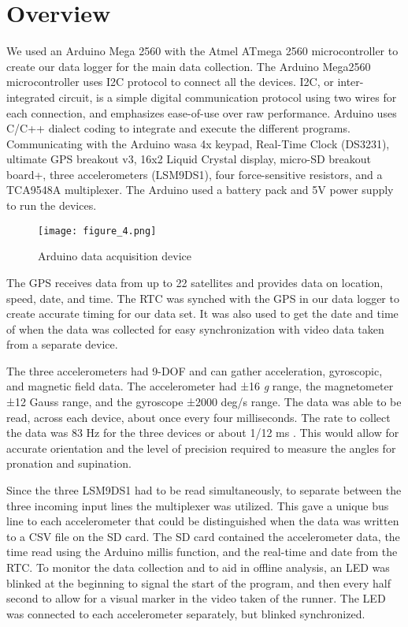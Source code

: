 \section{Overview}
We used an Arduino Mega 2560 with the Atmel ATmega 2560 microcontroller to create our data logger for the main data collection.
The Arduino Mega2560 microcontroller uses I2C protocol to connect all the devices.
I2C, or inter-integrated circuit, is a simple digital communication protocol using two wires for each connection, and emphasizes ease-of-use over raw performance.
Arduino uses C/C++ dialect coding to integrate and execute the different programs.
Communicating with the Arduino wasa  4x keypad, Real-Time Clock (DS3231), ultimate GPS breakout v3, 16x2 Liquid Crystal display, micro-SD breakout board+, three accelerometers (LSM9DS1), four force-sensitive resistors, and a TCA9548A multiplexer.
The Arduino used a battery pack and 5V power supply to run the devices.\par

\begin{figure}[h]
  \centering
  \texttt{[image: figure\_4.png]}
  \caption[DAC]{Arduino data acquisition device}
  \label{fig:x dac}
\end{figure}

The GPS receives data from up to 22 satellites and provides data on location, speed, date, and time.
The RTC was synched with the GPS in our data logger to create accurate timing for our data set.
It was also used to get the date and time of when the data was collected for easy synchronization with video data taken from a separate device.\par

The three accelerometers had 9-DOF and can gather acceleration, gyroscopic, and magnetic field data.
The accelerometer had ±16 \textit{g} range, the magnetometer ±12 Gauss range, and the gyroscope ±2000 deg/s range.
The data was able to be read, across each device, about once every four milliseconds.
The rate to collect the data was 83 Hz for the three devices or about 1/12 ms \parencite{adafruit}.
This would allow for accurate orientation and the level of precision required to measure the angles for pronation and supination.\par

Since the three LSM9DS1 had to be read simultaneously, to separate between the three incoming input lines the multiplexer was utilized.
This gave a unique bus line to each accelerometer that could be distinguished when the data was written to a CSV file on the SD card.
The SD card contained the accelerometer data, the time read using the Arduino millis function, and the real-time and date from the RTC.
To monitor the data collection and to aid in offline analysis, an LED was blinked at the beginning to signal the start of the program, and then every half second to allow for a visual marker in the video taken of the runner.
The LED was connected to each accelerometer separately, but blinked synchronized.\par

